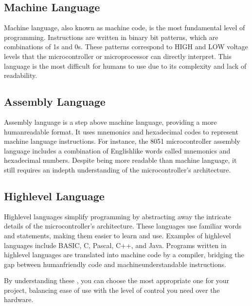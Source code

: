 \documentclass[letterpaper,10pt,english]{sphinxmanual}
\begin{document}
\subsection{Machine Language}
\label{\detokenize{about:machine-language}}
\sphinxAtStartPar
Machine language, also known as machine code, is the most fundamental level of programming. Instructions are written in binary bit patterns, which are combinations of 1s and 0s. These patterns correspond to HIGH and LOW voltage levels that the microcontroller or microprocessor can directly interpret. This language is the most difficult for humans to use due to its complexity and lack of readability.


\subsection{Assembly Language}
\label{\detokenize{about:assembly-language}}
\sphinxAtStartPar
Assembly language is a step above machine language, providing a more human\sphinxhyphen{}readable format. It uses mnemonics and hexadecimal codes to represent machine language instructions. For instance, the 8051 microcontroller assembly language includes a combination of English\sphinxhyphen{}like words called mnemonics and hexadecimal numbers. Despite being more readable than machine language, it still requires an in\sphinxhyphen{}depth understanding of the microcontroller’s architecture.


\subsection{High\sphinxhyphen{}level Language}
\label{\detokenize{about:high-level-language}}
\sphinxAtStartPar
High\sphinxhyphen{}level languages simplify programming by abstracting away the intricate details of the microcontroller’s architecture. These languages use familiar words and statements, making them easier to learn and use. Examples of high\sphinxhyphen{}level languages include BASIC, C, Pascal, C++, and Java. Programs written in high\sphinxhyphen{}level languages are translated into machine code by a compiler, bridging the gap between human\sphinxhyphen{}friendly code and machine\sphinxhyphen{}understandable instructions.

\sphinxAtStartPar
By understanding these  , you can choose the most appropriate one for your project, balancing ease of use with the level of control you need over the hardware.
\end{document}
